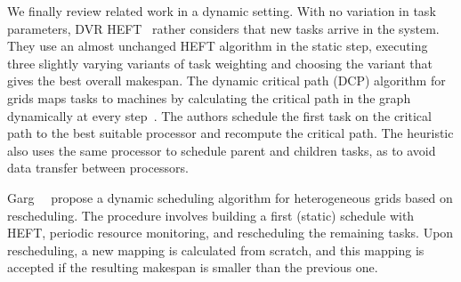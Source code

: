\documentclass[conference]{IEEEtran}
\begin{document}
\smallskip
{}
We finally review related work in a dynamic setting. With no variation in task parameters, 
    DVR HEFT~\cite{SANDOKJI2019482} rather considers that new tasks arrive in the system. 
    They use an almost unchanged HEFT algorithm in the static step, executing three slightly
    varying variants of task weighting and choosing the variant that gives the best overall makespan.
%
    The dynamic critical path (DCP) algorithm for grids maps tasks to machines
    by calculating the critical path in the graph dynamically at every step~\cite{rahman2013}.
    The authors schedule the first task on the critical path to the best suitable processor and recompute the critical path.
    The heuristic also uses the same processor to schedule parent and children tasks, as to avoid data transfer between processors.


    Garg~\etal~\cite{GARG2015256} propose a dynamic scheduling algorithm for heterogeneous grids based on rescheduling.
    The procedure involves building a first (static) schedule with HEFT, periodic resource monitoring, 
    and rescheduling the remaining tasks. 
    Upon rescheduling, a new mapping is calculated from scratch, and this mapping is accepted if the resulting makespan
    is smaller than the previous one.
%
\end{document}
